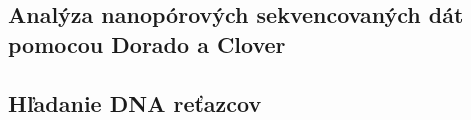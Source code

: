 \subsection{Analýza nanopórových sekvencovaných dát pomocou Dorado a Clover}






\subsection{Hľadanie DNA reťazcov}




